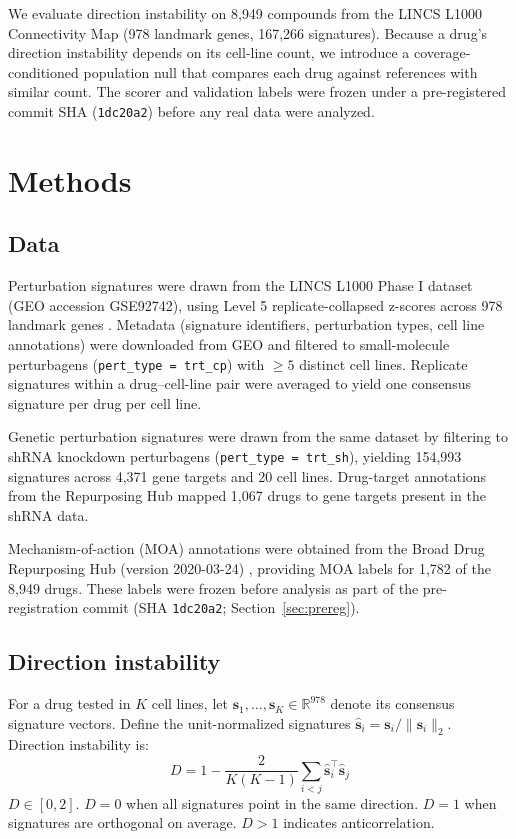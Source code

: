 \documentclass[11pt]{article}
\begin{document}
We evaluate direction instability on 8{,}949 compounds from the LINCS
L1000 Connectivity Map (978 landmark genes, 167{,}266 signatures).
Because a drug's direction instability depends on its cell-line count,
we introduce a coverage-conditioned population null that compares each
drug against references with similar count.  The scorer and validation
labels were frozen under a pre-registered commit SHA (\texttt{1dc20a2})
before any real data were analyzed.

\section{Methods}

\subsection{Data}

Perturbation signatures were drawn from the LINCS L1000 Phase I dataset
(GEO accession GSE92742), using Level 5 replicate-collapsed z-scores across
978 landmark genes \citep{subramanian2017next}. Metadata (signature
identifiers, perturbation types, cell line annotations) were downloaded from
GEO and filtered to small-molecule perturbagens (\texttt{pert\_type =
trt\_cp}) with $\geq5$ distinct cell lines. Replicate signatures within a
drug--cell-line pair were averaged to yield one consensus signature per
drug per cell line.

Genetic perturbation signatures were drawn from the same dataset by
filtering to shRNA knockdown perturbagens (\texttt{pert\_type = trt\_sh}),
yielding 154{,}993 signatures across 4{,}371 gene targets and 20 cell lines.
Drug-target annotations from the Repurposing Hub mapped 1{,}067 drugs to
gene targets present in the shRNA data.

Mechanism-of-action (MOA) annotations were obtained from the Broad Drug
Repurposing Hub (version 2020-03-24) \citep{corsello2017drug}, providing
MOA labels for 1{,}782 of the 8{,}949 drugs. These labels were frozen
before analysis as part of the pre-registration commit
(SHA \texttt{1dc20a2}; Section~\ref{sec:prereg}).

\subsection{Direction instability}

For a drug tested in $K$ cell lines, let $\mathbf{s}_1, \ldots,
\mathbf{s}_K \in \mathbb{R}^{978}$ denote its consensus signature vectors.
Define the unit-normalized signatures $\hat{\mathbf{s}}_i =
\mathbf{s}_i / \|\mathbf{s}_i\|_2$. Direction instability is:
\begin{equation}
  D = 1 - \frac{2}{K(K-1)} \sum_{i < j}
    \hat{\mathbf{s}}_i^\top \hat{\mathbf{s}}_j
  \label{eq:direction_instability}
\end{equation}
$D \in [0, 2]$. $D = 0$ when all signatures point in the same direction.
$D = 1$ when signatures are orthogonal on average. $D > 1$ indicates
anticorrelation.
\end{document}
